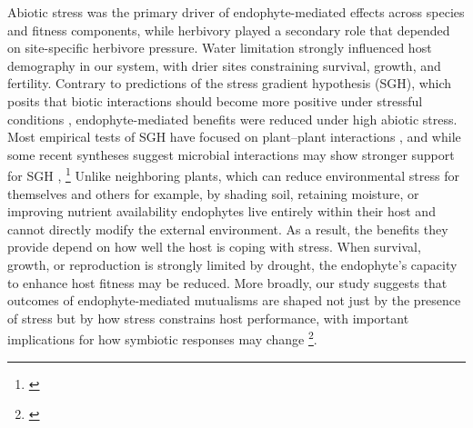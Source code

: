 \documentclass[12pt]{article}\usepackage[]{graphicx}\usepackage[dvipsnames]{xcolor}
\newcommand{\tom}[2]{{\color{red}{#1}}\footnote{\textit{\color{red}{#2}}}}
\begin{document}
Abiotic stress was the primary driver of endophyte-mediated effects across species and fitness components, while herbivory played a secondary role that depended on site-specific herbivore pressure.
Water limitation strongly influenced host demography in our system, with drier sites constraining survival, growth, and fertility.
Contrary to predictions of the stress gradient hypothesis (SGH), which posits that biotic interactions should become more positive under stressful conditions \citep{louthan2015and,lortie2006re}, endophyte-mediated benefits were reduced under high abiotic stress. 
Most empirical tests of SGH have focused on plant--plant interactions \citep{bertness1994positive}, and while some recent syntheses suggest microbial interactions may show stronger support for SGH \citep{piccardi2019toxicity,hammarlund2019refining}, \tom{our results indicate that host-associated plant microbe mutualisms may not conform to this pattern.}{Michelle Afkhami's mitigation--exacerbation paper is very relevant and should be cited here. We should also look at what recent papers have cited that paper.}
Unlike neighboring plants, which can reduce environmental stress for themselves and others for example, by shading soil, retaining moisture, or improving nutrient availability endophytes live entirely within their host and cannot directly modify the external environment. 
As a result, the benefits they provide depend on how well the host is coping with stress. 
When survival, growth, or reproduction is strongly limited by drought, the endophyte's capacity to enhance host fitness may be reduced.
More broadly, our study suggests that outcomes of endophyte-mediated mutualisms are shaped not just by the presence of stress but by how stress constrains host performance, with important implications for how symbiotic responses may change \tom{under increasing drought associated with climate change}{I think it would be good if we could expand the discussion of climate change. There is a lot of literature on microbial mutualisms and climate change, so we should reference more of that, and tie in our results. We may also want to reference Josh's GCB paper.}.



\newpage


\end{document}

